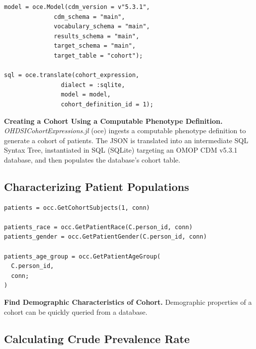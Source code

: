 \documentclass{juliacon}
\begin{document}
\begin{listing}[!ht]
\begin{verbatim}
model = oce.Model(cdm_version = v"5.3.1", 
              cdm_schema = "main",
              vocabulary_schema = "main", 
              results_schema = "main",
              target_schema = "main", 
              target_table = "cohort");

sql = oce.translate(cohort_expression, 
                dialect = :sqlite, 
                model = model, 
                cohort_definition_id = 1);
\end{verbatim}
\caption{\textbf{Creating a Cohort Using a Computable Phenotype Definition.} \textit{OHDSICohortExpressions.jl} (oce) ingests a computable phenotype definition to generate a cohort of patients. The JSON is translated into an intermediate SQL Syntax Tree, instantiated in SQL (SQLite) targeting an OMOP CDM v5.3.1 database, and then populates the database's cohort table.}
\label{listing:cohort_creation}
\end{listing}

\subsection{Characterizing Patient Populations}


\begin{listing}[!ht]
\begin{verbatim}
patients = occ.GetCohortSubjects(1, conn)

patients_race = occ.GetPatientRace(C.person_id, conn)
patients_gender = occ.GetPatientGender(C.person_id, conn)

patients_age_group = occ.GetPatientAgeGroup(
  C.person_id, 
  conn; 
)
\end{verbatim}
\caption{\textbf{Find Demographic Characteristics of Cohort.} Demographic properties of a cohort can be quickly queried from a database.}
\label{listing:demographics}
\end{listing}

\subsection{Calculating Crude Prevalence Rate}
\end{document}

